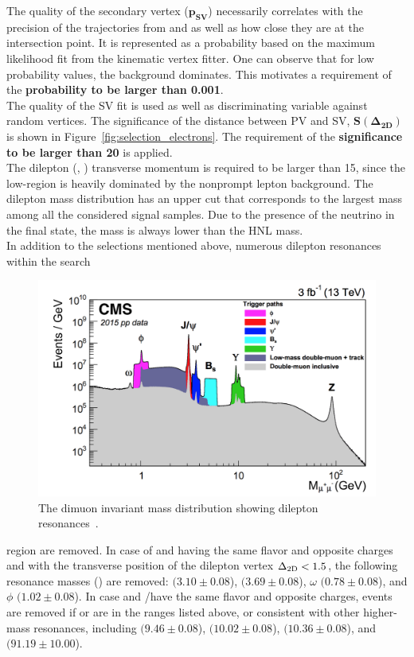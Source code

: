 The quality of the secondary vertex ($\boldsymbol{ p_{SV}}$) necessarily correlates with the precision of the trajectories from \ltwo and \lthree as well as how close they are at the intersection point. It is represented as a probability based on the maximum likelihood fit from the kinematic vertex fitter. One can observe that for low probability values, the background dominates. This motivates a requirement of the \textbf{probability to be larger than 0.001}. \\

The quality of the SV fit is used as well as discriminating variable against random vertices. The significance of the distance between PV and SV, $\boldsymbol{ S(\Delta_{2D})}$ is shown in Figure~\ref{fig:selection_electrons}. The requirement of the \textbf{significance to be larger than 20} is applied.\\

The dilepton (\ltwo, \lthree) transverse momentum  is required to be
larger than 15\GeV, since the low-\pt region is heavily dominated by
the nonprompt lepton background.
The dilepton mass \mtwol distribution has an upper cut that
corresponds to the largest mass among all the considered signal
samples. Due to the presence of the neutrino in the final state, the
mass is always lower than the HNL mass.\\

In addition to the selections mentioned above, numerous dilepton
resonances within the search
 \begin{figure}
\centering
\includegraphics[clip,trim=1.2cm 0.1cm 0.8cm 0.3cm, width=.40\textwidth]{Figures/c2/dimuon}
\caption{The dimuon invariant mass distribution showing dilepton resonances~\cite{Sirunyan_2018_muon}.}
\label{fig:c6dimuon}
\end{figure}
 region are removed.
In case of \ltwo and \lthree having the same flavor and opposite
charges and with the transverse position of the dilepton vertex
$\Delta_{\mathrm{2D}}<1.5$\cm, the following resonance masses (\mtwol) are
removed: 
\JPsi $(3.10 \pm 0.08$\GeV), \Pgy $(3.69 \pm 0.08$\GeV), $\omega$
$(0.78 \pm 0.08$\GeV), and $\phi$ $(1.02 \pm 0.08$\GeV).
In case \lone and \ltwo/\lthree have the same flavor and opposite
charges, events are removed if \mlonetwo or \mlonethree are in the
ranges listed above, or consistent with other higher-mass resonances,
including \PgUa $(9.46 \pm 0.08$\GeV), \PgUb $(10.02 \pm 0.08$\GeV),
\PgUc $(10.36 \pm 0.08$\GeV), and \PZ $(91.19 \pm 10.00$\GeV).

